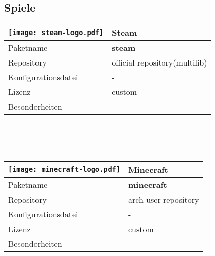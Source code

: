 \subsection{Spiele}
\begin{tabular}{l|l}
\texttt{[image: steam-logo.pdf]} & Steam \\ \hline
Paketname & \textbf{steam} \\ 
Repository & official repository(multilib) \\
Konfigurationsdatei & - \\
Lizenz & custom \\
Besonderheiten & - \\
\end{tabular}
\\ \\ \\
\begin{tabular}{l|l}
\texttt{[image: minecraft-logo.pdf]} & Minecraft \\ \hline
Paketname & \textbf{minecraft} \\ 
Repository & arch user repository \\
Konfigurationsdatei & - \\
Lizenz & custom \\
Besonderheiten & - \\
\end{tabular}
